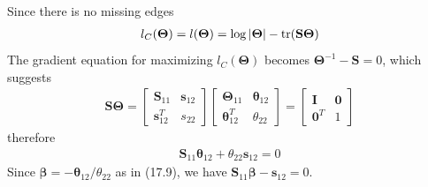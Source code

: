 \begin{exercise}
  Since there is no missing edges
  \begin{align}
    l_C(\mathbf{\Theta}) = l(\mathbf{\Theta}) = \log|\mathbf{\Theta}| -
    \tr(\mathbf{S\Theta})
  \end{align}
  The gradient equation for maximizing $l_C(\mathbf{\Theta})$ becomes
  $\mathbf{\Theta}^{-1} - \mathbf{S} = 0$, which suggests
  \begin{align}
    \mathbf{S\Theta} = 
    \left[
      \begin{array}{cc}
        \mathbf{S}_{11} & \mathbf{s}_{12} \\
        \mathbf{s}_{12}^T & s_{22}
      \end{array}
    \right]
    \left[
      \begin{array}{cc}
        \mathbf{\Theta}_{11} & \bm{\theta}_{12} \\
         \bm{\theta}_{12}^T & \theta_{22}
      \end{array}
    \right] = 
    \left[
      \begin{array}{cc}
        \mathbf{I} & \mathbf{0} \\
         \mathbf{0}^T & 1
      \end{array}
    \right] 
  \end{align}
  therefore
  \begin{align}
    \mathbf{S}_{11}\bm{\theta}_{12} + \theta_{22}\mathbf{s}_{12} = 0
  \end{align}
  Since $\bm{\beta} = -\bm{\theta}_{12} / \theta_{22}$ as in (17.9), we have
  $\mathbf{S}_{11}\bm{\beta} - \mathbf{s}_{12} = 0$.
\end{exercise}


